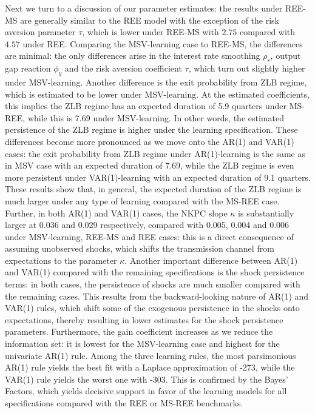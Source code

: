 \documentclass[12pt,reqno]{article}
\numberwithin{equation}{section}
\begin{document}
\noindent
Next we turn to a discussion of our parameter estimates: the results under REE-MS are generally similar to the REE model with the exception of the risk aversion parameter $\tau$, which is lower under REE-MS with $2.75 $ compared with $4.57 $ under REE. Comparing the MSV-learning case to REE-MS, the differences are minimal: the only differences arise in the interest rate smoothing $\rho_r$, output gap reaction $\phi_y$ and the risk aversion  coefficient $\tau$, which turn out slightly higher under MSV-learning. Another difference is the exit probability from ZLB regime, which is estimated to be lower under MSV-learning. At the estimated coefficients, this implies the ZLB regime has an expected duration of  5.9 quarters under MS-REE, while this is 7.69 under MSV-learning. In other words, the estimated persistence of the ZLB regime is higher under the learning specification. These differences become more pronounced as we move onto the AR(1) and VAR(1) cases: the exit probability from ZLB regime under AR(1)-learning is the same as in MSV case with an expected duration of 7.69, while the ZLB regime is even more persistent under VAR(1)-learning with an expected duration of 9.1 quarters. These results show that, in general, the expected duration of the ZLB regime is much larger under any type of learning compared with the MS-REE case. Further, in both AR(1) and VAR(1) cases, the NKPC slope $\kappa$ is substantially larger at 0.036 and 0.029 respectively, compared with 0.005, 0.004 and 0.006 under MSV-learning, REE-MS and REE cases: this is a direct consequence of assuming unobserved shocks, which shifts the transmission channel from expectations to the parameter $\kappa$. Another important difference between AR(1) and VAR(1) compared with the remaining specifications is the shock persistence terms: in both cases, the persistence of shocks are much smaller compared with the remaining cases. This results from the backward-looking nature of AR(1) and VAR(1) rules, which shift some of the exogenous persistence in the shocks onto expectations, thereby resulting in lower estimates for the shock persistence parameters. Furthermore, the gain coefficient increases as we reduce the information set: it is lowest for the MSV-learning case and highest for the univariate AR(1) rule. Among the three learning rules, the most parsimonious AR(1) rule yields the best fit with a Laplace approximation of -273, while the VAR(1) rule yields the worst one with -303. This is confirmed by the Bayes’ Factors, which yields decisive support in favor of the learning models for all specifications compared with the REE or MS-REE benchmarks. \\
\end{document}
